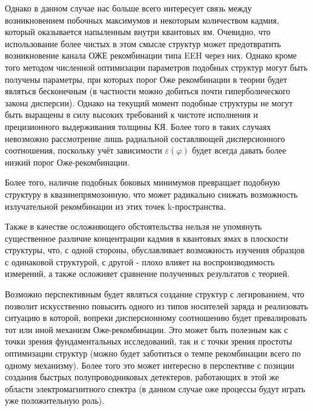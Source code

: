    Однако в данном случае нас больше всего интересует связь между возникновением побочных максимумов и некоторым количеством 
    кадмия, который оказывается напыленным внутри квантовых ям. Очевидно, что использование более чистых в этом смысле структур
    может предотвратить возникновение канала ОЖЕ рекомбинации типа EEH через них. Однако кроме того методом численной оптимизации параметров 
    подобных структур могут быть получены параметры, при которых порог Оже рекомбинации в теории будет являться бесконечным (в частности можно добиться почти 
    гиперболического закона дисперсии). Однако на текущий момент подобные структуры не могут быть выращены в силу высоких требований к чистоте исполнения и 
    прецизионного выдерживания толщины КЯ. Более того в таких случаях невозможно рассмотрение лишь радиальной составляющей дисперсионного соотношения,
    поскольку учёт зависимости $\varepsilon(\varphi)$ будет всегда давать более низкий порог Оже-рекомбинации.

    Более того, наличие подобных боковых минимумов превращает подобную структуру в квазинепрямозонную, что может радикально снижать возможность излучательной 
    рекомбинации из этих точек k-пространства. 

    Также в качестве осложняющего обстоятельства нельзя не упомянуть существенное различие концентрации кадмия в квантовых ямах в плоскости структуры,
    что, с одной стороны, обуславливает возможность изучения образцов с одинаковой структурой, с другой - плохо влияет на воспроизводимость измерений,
    а также осложняет сравнение полученных результатов с теорией.

    Возможно перспективным будет являться создание структур с легированием, что позволит искусственно повысить одного из типов носителей заряда и реализовать 
    ситуацию в которой, вопреки дисперсионному соотношению будет превалировать тот или иной механизм Оже-рекомбинации. Это может быть полезным как с точки зрения 
    фундаментальных исследований, так и с точки зрения простоты оптимизации структур (можно будет заботиться о темпе рекомбинации всего по одному механизму). 
    Более того это может интересно в перспективе с позиции создания быстрых полупроводниковых детектеров, работающих в этой же области электромагнитного спектра 
    (в данном случае оже процессы будут играть уже положительную роль).
    \newpage
